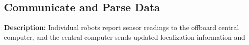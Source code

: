 \subsection{Communicate and Parse Data}
\textbf{Description:} Individual robots report sensor readings to the offboard central computer, and the central computer sends updated localization information and 

